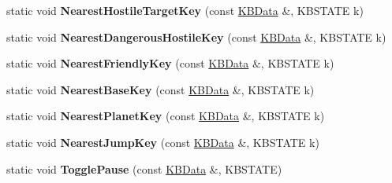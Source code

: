 \begin{DoxyCompactItemize}
\item 
static void {\bfseries Nearest\+Hostile\+Target\+Key} (const \hyperlink{classKBData}{K\+B\+Data} \&, K\+B\+S\+T\+A\+TE k)\hypertarget{classFireKeyboard_ac4f0b9d04aaeed799d351c1904e2f6e6}{}\label{classFireKeyboard_ac4f0b9d04aaeed799d351c1904e2f6e6}

\item 
static void {\bfseries Nearest\+Dangerous\+Hostile\+Key} (const \hyperlink{classKBData}{K\+B\+Data} \&, K\+B\+S\+T\+A\+TE k)\hypertarget{classFireKeyboard_a9d31418ea860bb2b35921bfa5a9f79ca}{}\label{classFireKeyboard_a9d31418ea860bb2b35921bfa5a9f79ca}

\item 
static void {\bfseries Nearest\+Friendly\+Key} (const \hyperlink{classKBData}{K\+B\+Data} \&, K\+B\+S\+T\+A\+TE k)\hypertarget{classFireKeyboard_a792af2d909b63054a483a508c78a3362}{}\label{classFireKeyboard_a792af2d909b63054a483a508c78a3362}

\item 
static void {\bfseries Nearest\+Base\+Key} (const \hyperlink{classKBData}{K\+B\+Data} \&, K\+B\+S\+T\+A\+TE k)\hypertarget{classFireKeyboard_ab47169d0e1dd1343ec17065494019812}{}\label{classFireKeyboard_ab47169d0e1dd1343ec17065494019812}

\item 
static void {\bfseries Nearest\+Planet\+Key} (const \hyperlink{classKBData}{K\+B\+Data} \&, K\+B\+S\+T\+A\+TE k)\hypertarget{classFireKeyboard_ab7a842ff6a3278d06071c0ff6ce59d22}{}\label{classFireKeyboard_ab7a842ff6a3278d06071c0ff6ce59d22}

\item 
static void {\bfseries Nearest\+Jump\+Key} (const \hyperlink{classKBData}{K\+B\+Data} \&, K\+B\+S\+T\+A\+TE k)\hypertarget{classFireKeyboard_adbade7f9a2c02762e93358169f32c007}{}\label{classFireKeyboard_adbade7f9a2c02762e93358169f32c007}

\item 
static void {\bfseries Toggle\+Pause} (const \hyperlink{classKBData}{K\+B\+Data} \&, K\+B\+S\+T\+A\+TE)\hypertarget{classFireKeyboard_a143e5a0b30f6fe61e64b786b0bc015f5}{}\label{classFireKeyboard_a143e5a0b30f6fe61e64b786b0bc015f5}

\end{DoxyCompactItemize}
